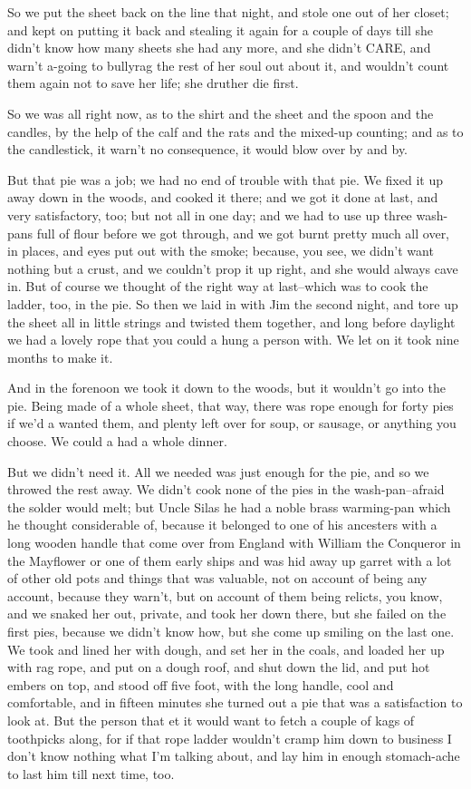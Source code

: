 So we put the sheet back on the line that night, and stole one out of her
closet; and kept on putting it back and stealing it again for a couple of
days till she didn't know how many sheets she had any more, and she
didn't CARE, and warn't a-going to bullyrag the rest of her soul out
about it, and wouldn't count them again not to save her life; she druther
die first.

So we was all right now, as to the shirt and the sheet and the spoon and
the candles, by the help of the calf and the rats and the mixed-up
counting; and as to the candlestick, it warn't no consequence, it would
blow over by and by.

But that pie was a job; we had no end of trouble with that pie.  We fixed
it up away down in the woods, and cooked it there; and we got it done at
last, and very satisfactory, too; but not all in one day; and we had to
use up three wash-pans full of flour before we got through, and we got
burnt pretty much all over, in places, and eyes put out with the smoke;
because, you see, we didn't want nothing but a crust, and we couldn't
prop it up right, and she would always cave in.  But of course we thought
of the right way at last--which was to cook the ladder, too, in the
pie.  So then we laid in with Jim the second night, and tore up the sheet
all in little strings and twisted them together, and long before daylight
we had a lovely rope that you could a hung a person with.  We let on it
took nine months to make it.

And in the forenoon we took it down to the woods, but it wouldn't go into
the pie.  Being made of a whole sheet, that way, there was rope enough
for forty pies if we'd a wanted them, and plenty left over for soup, or
sausage, or anything you choose.  We could a had a whole dinner.

But we didn't need it.  All we needed was just enough for the pie,
and so we throwed the rest away.  We didn't cook none of the pies in the
wash-pan--afraid the solder would melt; but Uncle Silas he had a noble
brass warming-pan which he thought considerable of, because it belonged
to one of his ancesters with a long wooden handle that come over from
England with William the Conqueror in the Mayflower or one of them early
ships and was hid away up garret with a lot of other old pots and things
that was valuable, not on account of being any account, because they
warn't, but on account of them being relicts, you know, and we snaked her
out, private, and took her down there, but she failed on the first pies,
because we didn't know how, but she come up smiling on the last one.  We
took and lined her with dough, and set her in the coals, and loaded her
up with rag rope, and put on a dough roof, and shut down the lid, and put
hot embers on top, and stood off five foot, with the long handle, cool
and comfortable, and in fifteen minutes she turned out a pie that was a
satisfaction to look at. But the person that et it would want to fetch a
couple of kags of toothpicks along, for if that rope ladder wouldn't
cramp him down to business I don't know nothing what I'm talking about,
and lay him in enough stomach-ache to last him till next time, too.

